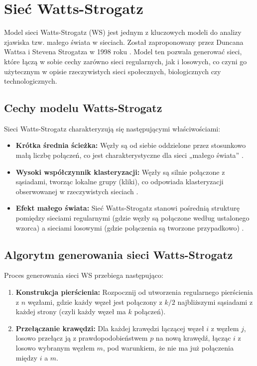 \section{Sieć Watts-Strogatz}
Model sieci Watts-Strogatz (WS) jest jednym z kluczowych modeli do analizy zjawiska tzw. małego świata w sieciach.
Został zaproponowany przez Duncana Wattsa i Stevena Strogatza w 1998 roku \cite{Watts1998}.
Model ten pozwala generować sieci, które łączą w sobie cechy zarówno sieci regularnych, jak i losowych, co czyni go użytecznym w opisie rzeczywistych sieci społecznych, biologicznych czy technologicznych.

\subsection{Cechy modelu Watts-Strogatz}
Sieci Watts-Strogatz charakteryzują się następującymi właściwościami:
\begin{itemize}
    \item \textbf{Krótka średnia ścieżka:} Węzły są od siebie oddzielone przez stosunkowo małą liczbę połączeń, co jest charakterystyczne dla sieci „małego świata” \cite{Watts1998}.
    \item \textbf{Wysoki współczynnik klasteryzacji:} Węzły są silnie połączone z sąsiadami, tworząc lokalne grupy (kliki), co odpowiada klasteryzacji obserwowanej w rzeczywistych sieciach \cite{Watts1998}.
    \item \textbf{Efekt małego świata:} Sieć Watts-Strogatz stanowi pośrednią strukturę pomiędzy sieciami regularnymi (gdzie węzły są połączone według ustalonego wzorca) a sieciami losowymi (gdzie połączenia są tworzone przypadkowo) \cite{Watts1998}.
\end{itemize}

\subsection{Algorytm generowania sieci Watts-Strogatz}
Proces generowania sieci WS przebiega następująco:

\begin{enumerate}
    \item \textbf{Konstrukcja pierścienia:} Rozpocznij od utworzenia regularnego pierścienia z $n$ węzłami,
          gdzie każdy węzeł jest połączony z $k/2$ najbliższymi sąsiadami z każdej strony (czyli każdy węzeł ma $k$ połączeń).
    \item \textbf{Przełączanie krawędzi:} Dla każdej krawędzi łączącej węzeł $i$ z węzłem $j$, losowo przełącz ją z prawdopodobieństwem $p$ na nową krawędź,
          łącząc $i$ z losowo wybranym węzłem $m$, pod warunkiem, że nie ma już połączenia między $i$ a $m$.
\end{enumerate}

